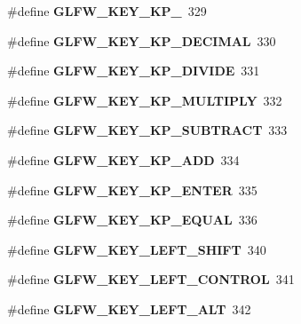 \begin{DoxyCompactItemize}
\#define {\bfseries G\+L\+F\+W\+\_\+\+K\+E\+Y\+\_\+\+K\+P\+\_}~329
\item 
\mbox{\label{group__keys_ga4e231d968796331a9ea0dbfb98d4005b}} 
\#define {\bfseries G\+L\+F\+W\+\_\+\+K\+E\+Y\+\_\+\+K\+P\+\_\+\+D\+E\+C\+I\+M\+AL}~330
\item 
\mbox{\label{group__keys_gabca1733780a273d549129ad0f250d1e5}} 
\#define {\bfseries G\+L\+F\+W\+\_\+\+K\+E\+Y\+\_\+\+K\+P\+\_\+\+D\+I\+V\+I\+DE}~331
\item 
\mbox{\label{group__keys_ga9ada267eb0e78ed2ada8701dd24a56ef}} 
\#define {\bfseries G\+L\+F\+W\+\_\+\+K\+E\+Y\+\_\+\+K\+P\+\_\+\+M\+U\+L\+T\+I\+P\+LY}~332
\item 
\mbox{\label{group__keys_gaa3dbd60782ff93d6082a124bce1fa236}} 
\#define {\bfseries G\+L\+F\+W\+\_\+\+K\+E\+Y\+\_\+\+K\+P\+\_\+\+S\+U\+B\+T\+R\+A\+CT}~333
\item 
\mbox{\label{group__keys_gad09c7c98acc79e89aa6a0a91275becac}} 
\#define {\bfseries G\+L\+F\+W\+\_\+\+K\+E\+Y\+\_\+\+K\+P\+\_\+\+A\+DD}~334
\item 
\mbox{\label{group__keys_ga4f728f8738f2986bd63eedd3d412e8cf}} 
\#define {\bfseries G\+L\+F\+W\+\_\+\+K\+E\+Y\+\_\+\+K\+P\+\_\+\+E\+N\+T\+ER}~335
\item 
\mbox{\label{group__keys_gaebdc76d4a808191e6d21b7e4ad2acd97}} 
\#define {\bfseries G\+L\+F\+W\+\_\+\+K\+E\+Y\+\_\+\+K\+P\+\_\+\+E\+Q\+U\+AL}~336
\item 
\mbox{\label{group__keys_ga8a530a28a65c44ab5d00b759b756d3f6}} 
\#define {\bfseries G\+L\+F\+W\+\_\+\+K\+E\+Y\+\_\+\+L\+E\+F\+T\+\_\+\+S\+H\+I\+FT}~340
\item 
\mbox{\label{group__keys_ga9f97b743e81460ac4b2deddecd10a464}} 
\#define {\bfseries G\+L\+F\+W\+\_\+\+K\+E\+Y\+\_\+\+L\+E\+F\+T\+\_\+\+C\+O\+N\+T\+R\+OL}~341
\item 
\mbox{\label{group__keys_ga7f27dabf63a7789daa31e1c96790219b}} 
\#define {\bfseries G\+L\+F\+W\+\_\+\+K\+E\+Y\+\_\+\+L\+E\+F\+T\+\_\+\+A\+LT}~342

\end{DoxyCompactItemize}
